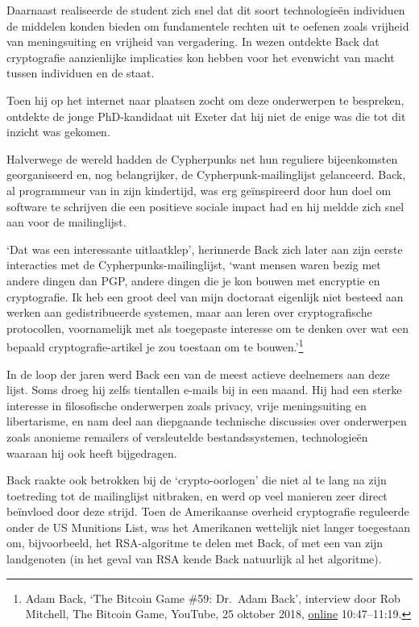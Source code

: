 \documentclass[
  a5paper,
  smalldemyvopaper,11pt,twoside,onecolumn,openright,extrafontsizes]{memoir}
\begin{document}
Daarnaast realiseerde de student zich snel dat dit soort technologieën
individuen de middelen konden bieden om fundamentele rechten uit te
oefenen zoals vrijheid van meningsuiting en vrijheid van vergadering. In
wezen ontdekte Back dat cryptografie aanzienlijke implicaties kon hebben
voor het evenwicht van macht tussen individuen en de staat.

Toen hij op het internet naar plaatsen zocht om deze onderwerpen te
bespreken, ontdekte de jonge PhD-kandidaat uit Exeter dat hij niet de
enige was die tot dit inzicht was gekomen.

Halverwege de wereld hadden de Cypherpunks net hun reguliere
bijeenkomsten georganiseerd en, nog belangrijker, de
Cypherpunk-mailinglijst gelanceerd. Back, al programmeur van in zijn
kindertijd, was erg geïnspireerd door hun doel om software te schrijven
die een positieve sociale impact had en hij meldde zich snel aan voor de
mailinglijst.

`Dat was een interessante uitlaatklep', herinnerde Back zich later aan
zijn eerste interacties met de Cypherpunks-mailinglijst, `want mensen
waren bezig met andere dingen dan PGP, andere dingen die je kon bouwen
met encryptie en cryptografie. Ik heb een groot deel van mijn doctoraat
eigenlijk niet besteed aan werken aan gedistribueerde systemen, maar aan
leren over cryptografische protocollen, voornamelijk met als toegepaste
interesse om te denken over wat een bepaald cryptografie-artikel je zou
toestaan om te bouwen.'\footnote{Adam Back, `The Bitcoin Game \#59:
  Dr.~Adam Back', interview door Rob Mitchell, The Bitcoin Game,
  YouTube, 25 oktober 2018,
  \href{https://www.youtube.com/watch?v=xxYsRjanphA&t=647s}{online}
  10:47--11:19.}

In de loop der jaren werd Back een van de meest actieve deelnemers aan
deze lijst. Soms droeg hij zelfs tientallen e-mails bij in een maand.
Hij had een sterke interesse in filosofische onderwerpen zoals privacy,
vrije meningsuiting en libertarisme, en nam deel aan diepgaande
technische discussies over onderwerpen zoals anonieme remailers of
versleutelde bestandssystemen, technologieën waaraan hij ook heeft
bijgedragen.

Back raakte ook betrokken bij de `crypto-oorlogen' die niet al te lang
na zijn toetreding tot de mailinglijst uitbraken, en werd op veel
manieren zeer direct beïnvloed door deze strijd. Toen de Amerikaanse
overheid cryptografie reguleerde onder de US Munitions List, was het
Amerikanen wettelijk niet langer toegestaan om, bijvoorbeeld, het
RSA-algoritme te delen met Back, of met een van zijn landgenoten (in het
geval van RSA kende Back natuurlijk al het algoritme).
\end{document}
